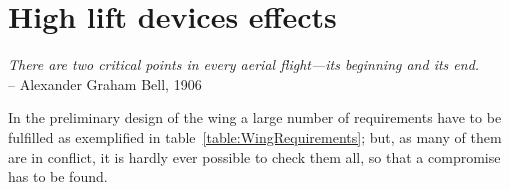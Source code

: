 \chapter{High lift devices effects}
\label{chap:HighLift}

\begin{flushright}
	{\smaller
		\textit{There are two critical points in every aerial flight—its beginning and its end.}\\
		-- Alexander Graham Bell, 1906}
\end{flushright}

\noindent
In the preliminary design of the wing a large number of requirements have to be fulfilled as exemplified in table~\ref{table:WingRequirements}; but, as many of them are in conflict, it is hardly ever possible to check them all, so that a compromise has to be found.
%
\begin{table}[H]
\caption{Some wing design requirements}
\label{table:WingRequirements}
\end{table}

